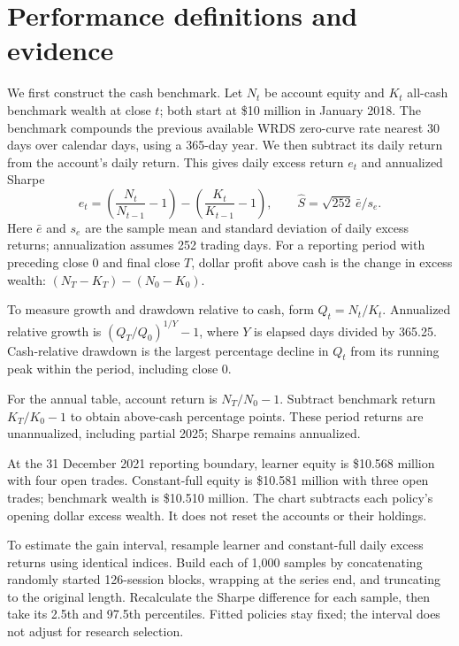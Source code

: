 \documentclass[11pt,letterpaper]{article}
\newcommand{\money}[1]{\$#1}
\begin{document}
\clearpage
\section{Performance definitions and evidence}
\label{app:metrics}
We first construct the cash benchmark. Let $N_t$ be account equity and $K_t$
all-cash benchmark wealth at close $t$; both start at \money{10 million} in
January 2018. The benchmark compounds the previous available WRDS zero-curve
rate nearest 30 days over calendar days, using a 365-day year. We then subtract
its daily return from the account's daily return. This gives daily excess
return $e_t$ and annualized Sharpe
\[
e_t=\left(\frac{N_t}{N_{t-1}}-1\right)
-\left(\frac{K_t}{K_{t-1}}-1\right),\qquad
\widehat S=\sqrt{252}\,\bar e/s_e.
\]
Here $\bar e$ and $s_e$ are the sample mean and standard deviation of daily
excess returns; annualization assumes 252 trading days. For a reporting period
with preceding close $0$ and final close $T$, dollar profit above cash is the
change in excess wealth: $(N_T-K_T)-(N_0-K_0)$.

To measure growth and drawdown relative to cash, form $Q_t=N_t/K_t$.
Annualized relative growth is $(Q_T/Q_0)^{1/Y}-1$, where $Y$ is elapsed days
divided by 365.25. Cash-relative drawdown is the largest percentage decline
in $Q_t$ from its running peak within the period, including close $0$.

For the annual table, account return is $N_T/N_0-1$. Subtract benchmark
return $K_T/K_0-1$ to obtain above-cash percentage points. These period returns
are unannualized, including partial 2025; Sharpe remains annualized.

At the 31 December 2021 reporting boundary, learner equity is
\money{10.568 million} with four open trades. Constant-full equity is
\money{10.581 million} with three open trades; benchmark wealth is
\money{10.510 million}. The chart subtracts each policy's opening dollar excess
wealth. It does not reset the accounts or their holdings.

To estimate the gain interval, resample learner and constant-full daily excess
returns using identical indices. Build each of 1,000 samples by concatenating
randomly started 126-session blocks, wrapping at the series end, and truncating
to the original length. Recalculate the Sharpe difference for each sample,
then take its 2.5th and 97.5th percentiles. Fitted policies stay fixed; the
interval does not adjust for research selection.
\end{document}
